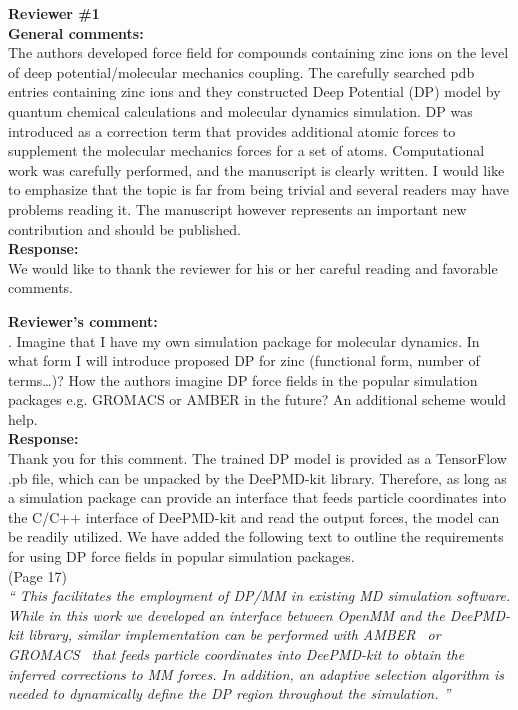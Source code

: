 \documentclass[doublespace,prb,aps,preprint]{revtex4}
\newcommand{\Quote}[1]{\textsl{``#1''}}
\newenvironment{Comment}{ {\bf \indent Reviewer's comment: \\} \setlength{\parindent}{1cm}  \sffamily }{ \ignorespacesafterend \\}
\newenvironment{GeneralComment}{ {\bf \indent General comments: \\} \setlength{\parindent}{1cm}  \sffamily }{ \ignorespacesafterend \\}
\newenvironment{Reply}{  {\bf Response: \\}  \setlength{\parindent}{1cm} \normalfont }{ \ignorespacesafterend \vspace{5mm}}
\begin{document}
\noindent
\textbf{Reviewer \#1} \\
\begin{GeneralComment}
The authors developed force field for compounds containing zinc ions on the level of deep potential/molecular mechanics coupling. 
The carefully searched pdb entries containing zinc ions and they constructed Deep Potential (DP) model by quantum chemical calculations and molecular dynamics simulation. 
DP was introduced as a correction term that provides additional atomic forces to supplement the molecular mechanics forces for a set of atoms. 
Computational work was carefully performed, and the manuscript is clearly written. 
I would like to emphasize that the topic is far from being trivial and several readers may have problems reading it. 
The manuscript however represents an important new contribution and should be published.
\end{GeneralComment}
\begin{Reply}
We would like to thank the reviewer for his or her careful reading and favorable comments.
\end{Reply}

\begin{Comment}
1. Imagine that I have my own simulation package for molecular dynamics. 
In what form I will introduce proposed DP for zinc (functional form, number of terms…)? 
How the authors imagine DP force fields in the popular simulation packages e.g. GROMACS or AMBER in the future? An additional scheme would help.
\end{Comment}
\begin{Reply}
    Thank you for this comment. The trained DP model is provided as a TensorFlow .pb file, which can be unpacked by the DeePMD-kit library. Therefore, as long as a simulation package can provide an interface that feeds particle coordinates into the C/C++ interface of DeePMD-kit and read the output forces, the model can be readily utilized. We have added the following text to outline the requirements for using DP force fields in popular simulation packages.  \\
    \newline
    (Page 17) \\
    \Quote{ This facilitates the employment of DP/MM in existing MD simulation software. While in this work we developed an interface between OpenMM and the DeePMD-kit library, similar implementation can be performed with AMBER~\cite{case2023amber} or GROMACS~\cite{abraham2015gromacs} that feeds particle coordinates into DeePMD-kit to obtain the inferred corrections to MM forces. In addition, an adaptive selection algorithm is needed to dynamically define the DP region throughout the simulation. }    
\end{Reply}
\end{document}

